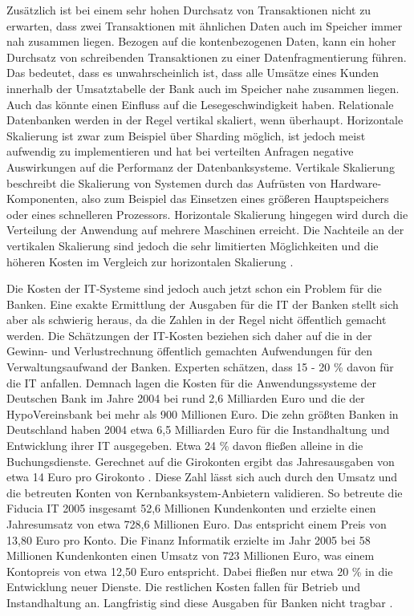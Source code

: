 \documentclass[12pt,oneside,a4paper,parskip]{scrbook}
\begin{document}
Zusätzlich ist bei einem sehr hohen Durchsatz von Transaktionen nicht zu erwarten, dass zwei Transaktionen mit ähnlichen Daten auch im Speicher immer nah zusammen liegen. Bezogen auf die kontenbezogenen Daten, kann ein hoher Durchsatz von schreibenden Transaktionen zu einer Datenfragmentierung führen. Das bedeutet, dass es unwahrscheinlich ist, dass alle Umsätze eines Kunden innerhalb der Umsatztabelle der Bank auch im Speicher nahe zusammen liegen. Auch das könnte einen Einfluss auf die Lesegeschwindigkeit haben. Relationale Datenbanken werden in der Regel vertikal skaliert, wenn überhaupt. Horizontale Skalierung ist zwar zum Beispiel über Sharding möglich, ist jedoch meist aufwendig zu implementieren und hat bei verteilten Anfragen negative Auswirkungen auf die Performanz der Datenbanksysteme. Vertikale Skalierung beschreibt die Skalierung von Systemen durch das Aufrüsten von Hardware-Komponenten, also zum Beispiel das Einsetzen eines größeren Hauptspeichers oder eines schnelleren Prozessors. Horizontale Skalierung hingegen wird durch die Verteilung der Anwendung auf mehrere Maschinen erreicht. Die Nachteile an der vertikalen Skalierung sind jedoch die sehr limitierten Möglichkeiten und die höheren Kosten im Vergleich zur horizontalen Skalierung \cite{sharding}\cite{rdbmssuck}. 

Die Kosten der IT-Systeme sind jedoch auch jetzt schon ein Problem für die Banken. Eine exakte Ermittlung der Ausgaben für die IT der Banken stellt sich aber als schwierig heraus, da die Zahlen in der Regel nicht öffentlich gemacht werden. Die Schätzungen der IT-Kosten beziehen sich daher auf die in der Gewinn- und Verlustrechnung öffentlich gemachten Aufwendungen für den Verwaltungsaufwand der Banken. Experten schätzen, dass 15 - 20 \% davon für die IT anfallen. Demnach lagen die Kosten für die Anwendungssysteme der Deutschen Bank im Jahre 2004 bei rund 2,6 Milliarden Euro und die der HypoVereinsbank bei mehr als 900 Millionen Euro. Die zehn größten Banken in Deutschland haben 2004 etwa 6,5 Milliarden Euro für die Instandhaltung und Entwicklung ihrer IT ausgegeben. 
Etwa 24 \% davon fließen alleine in die Buchungsdienste. Gerechnet auf die Girokonten ergibt das Jahresausgaben von etwa 14 Euro pro Girokonto \cite[29-39]{ITidF}. Diese Zahl lässt sich auch durch den Umsatz und die betreuten Konten von Kernbanksystem-Anbietern validieren. So betreute die Fiducia IT 2005 insgesamt 52,6 Millionen Kundenkonten und erzielte einen Jahresumsatz von etwa 728,6 Millionen Euro. Das entspricht einem Preis von 13,80 Euro pro Konto. Die Finanz Informatik erzielte im Jahr 2005 bei 58 Millionen Kundenkonten einen Umsatz von 723 Millionen Euro, was einem Kontopreis von etwa 12,50 Euro entspricht. Dabei fließen nur etwa 20 \% in die Entwicklung neuer Dienste. Die restlichen Kosten fallen für Betrieb und Instandhaltung an. Langfristig sind diese Ausgaben für Banken nicht tragbar \cite[75-91]{ITidF}\cite{SuPdIiB}\cite[41-42]{DdF}\cite{bankingsCosts}. 
\end{document}

